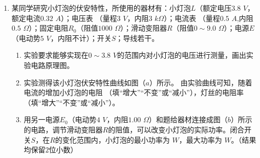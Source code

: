 \begin{enumerate}[leftmargin=0em]




\item 
{}
某同学研究小灯泡的伏安特性，所使用的器材有：小灯泡$ L $（额定电压$ 3.8 $ $ V $，额定电流$ 0.32 $ $ A $）；电压表 \voltmetermytikz （量程$ 3 $ $ V $，内阻$ 3 $ $ k \Omega $）；电流表 \ammetermytikz （量程$ 0.5 $ $ A $,内阻$ 0.5 $ $ \Omega $）；固定电阻$ R_{0} $（阻值$ 1000 $ $ \Omega $）；滑动变阻器$ R $（阻值$ 0 \sim 9.0 $ $ \Omega $）；电源$ E $（电动势$ 5 $ $ V $，内阻不计）；开关$ S $；导线若干。


\begin{enumerate}
\renewcommand{\labelenumi}{\arabic{enumi}.}
\item
实验要求能够实现在$ 0 \sim 3.8 $ $ V $的范围内对小灯泡的电压进行测量，画出实验电路原理图。

\item 
实验测得该小灯泡伏安特性曲线如图（$ a $）所示。
由实验曲线可知，随着电流的增加小灯泡的电阻  
（填“增大”“不变”或“减小”），灯丝的电阻率  
（填“增大”“不变”或“减小”）。
\begin{figure}[h!]
\centering

\end{figure}

\item 
用另一电源$ E_{0} $（电动势$ 4 $ $ V $，内阻$ 1.00 $ $ \Omega $）和题给器材连接成图（$ b $）所示的电路，调节滑动变阻器$ R $的阻值，可以改变小灯泡的实际功率。闭合开关$ S $，在$ R $的变化范围内，小灯泡的最小功率为  
$ W $，最大功率为  
$ W $。（结果均保留$ 2 $位小数）





\end{enumerate}
\end{enumerate}

